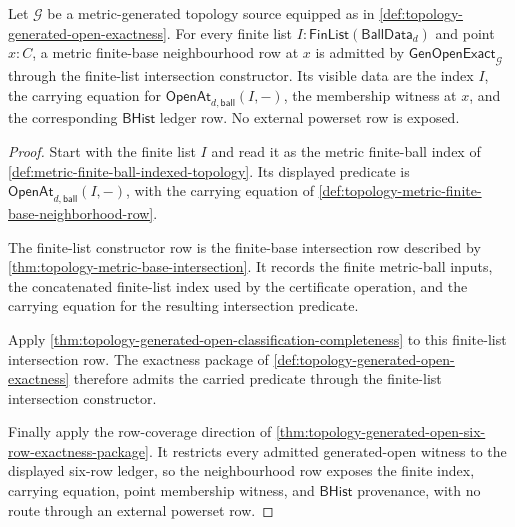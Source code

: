 \begin{theorem}
\label{thm:topology-metric-finite-base-neighborhood-ledger-coverage}
Let $\mathcal{G}$ be a metric-generated topology source equipped as in \autoref{def:topology-generated-open-exactness}. For every finite list $I:\mathsf{FinList}(\mathsf{BallData}_d)$ and point $x:C$, a metric finite-base neighbourhood row at $x$ is admitted by $\mathsf{GenOpenExact}_{\mathcal{G}}$ through the finite-list intersection constructor. Its visible data are the index $I$, the carrying equation for $\mathsf{OpenAt}_{d,\mathsf{ball}}(I,-)$, the membership witness at $x$, and the corresponding $\mathsf{BHist}$ ledger row. No external powerset row is exposed.
\end{theorem}
\begin{proof}
Start with the finite list $I$ and read it as the metric finite-ball index of \autoref{def:metric-finite-ball-indexed-topology}. Its displayed predicate is $\mathsf{OpenAt}_{d,\mathsf{ball}}(I,-)$, with the carrying equation of \autoref{def:topology-metric-finite-base-neighborhood-row}.

The finite-list constructor row is the finite-base intersection row described by \autoref{thm:topology-metric-base-intersection}. It records the finite metric-ball inputs, the concatenated finite-list index used by the certificate operation, and the carrying equation for the resulting intersection predicate.

Apply \autoref{thm:topology-generated-open-classification-completeness} to this finite-list intersection row. The exactness package of \autoref{def:topology-generated-open-exactness} therefore admits the carried predicate through the finite-list intersection constructor.

Finally apply the row-coverage direction of \autoref{thm:topology-generated-open-six-row-exactness-package}. It restricts every admitted generated-open witness to the displayed six-row ledger, so the neighbourhood row exposes the finite index, carrying equation, point membership witness, and $\mathsf{BHist}$ provenance, with no route through an external powerset row.
\end{proof}
